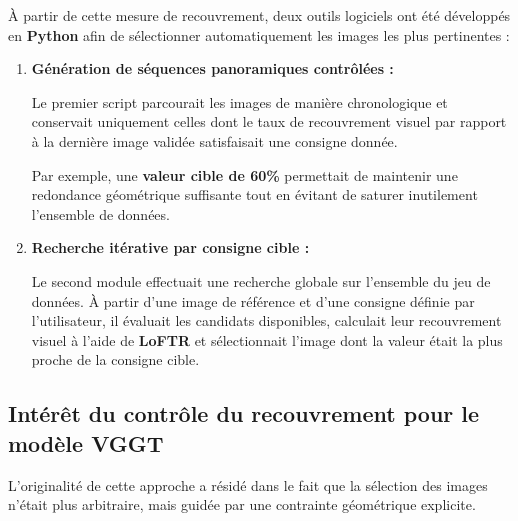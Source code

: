 \documentclass[12pt,a4paper,oneside]{report}
\begin{document}
\hspace*{1cm}À partir de cette mesure de recouvrement, deux outils logiciels ont été développés en \textbf{Python} afin de sélectionner automatiquement les images les plus pertinentes :\vspace{0.2cm}
\begin{enumerate}[label=$\bullet$, itemsep=0.5em]

    \item \textbf{Génération de séquences panoramiques contrôlées :}\vspace{0.05cm}

    \hspace*{1cm}Le premier script parcourait les images de manière chronologique et conservait uniquement celles dont le taux de recouvrement visuel par rapport à la dernière image validée satisfaisait une consigne donnée.\vspace{0.05cm}

    \hspace*{1cm}Par exemple, une \textbf{valeur cible de 60\% } permettait de maintenir une redondance géométrique suffisante tout en évitant de saturer inutilement l'ensemble de données.

\vspace{0.5cm}

    \item \textbf{Recherche itérative par consigne cible :}\vspace{0.05cm}

    \hspace*{1cm}Le second module effectuait une recherche globale sur l'ensemble du jeu de données. À partir d'une image de référence et d'une consigne définie par l'utilisateur, il évaluait les candidats disponibles, calculait leur recouvrement visuel à l'aide de \textbf{LoFTR} et sélectionnait l'image dont la valeur était la plus proche de la consigne cible.

\end{enumerate}

\par\bigskip
\par\bigskip

\subsection{Intérêt du contrôle du recouvrement pour le modèle VGGT}

\vspace{0.5cm}

\hspace*{1cm}L'originalité de cette approche a résidé dans le fait que la sélection des images n'était plus arbitraire, mais guidée par une contrainte géométrique explicite.\vspace{0.05cm}
\end{document}
